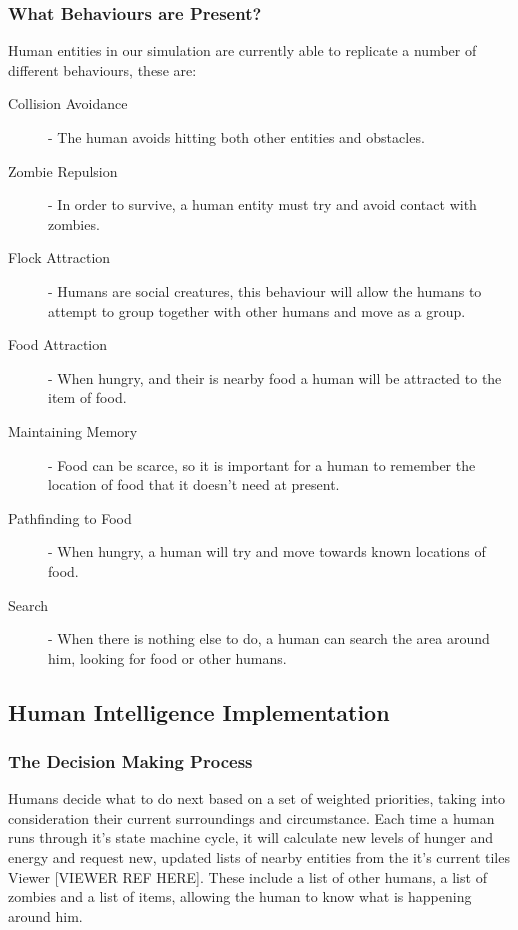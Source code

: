 \subsubsection{What Behaviours are Present?}
Human entities in our simulation are currently able to replicate a number of different behaviours, these are:
\begin{description}
  \item[Collision Avoidance] - The human avoids hitting both other entities and obstacles.
  \item[Zombie Repulsion] - In order to survive, a human entity must try and avoid contact with zombies.
  \item[Flock Attraction] - Humans are social creatures, this behaviour will allow the humans to attempt to group together with other humans and move as a group.
  \item[Food Attraction] - When hungry, and their is nearby food a human will be attracted to the item of food.
  \item[Maintaining Memory] - Food can be scarce, so it is important for a human to remember the location of food that it doesn't need at present.
  \item[Pathfinding to Food] - When hungry, a human will try and move towards known locations of food.
  \item[Search] - When there is nothing else to do, a human can search the area around him, looking for food or other humans.
\end{description}

\subsection{Human Intelligence Implementation}
\subsubsection{The Decision Making Process}
Humans decide what to do next based on a set of weighted priorities, taking into consideration their current surroundings and circumstance. Each time a human runs through it's state machine cycle, it will calculate new levels of hunger and energy and request new, updated lists of nearby entities from the it's current tiles Viewer [VIEWER REF HERE]. These include a list of other humans, a list of zombies and a list of items, allowing the human to know what is happening around him.

